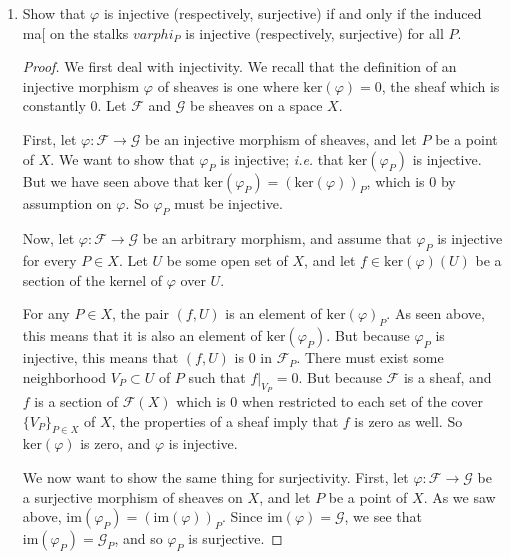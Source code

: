 \documentclass[12pt]{article}
\theoremstyle{definition}
\newenvironment{problem}[2][Problem]{\begin{trivlist}
\item[\hskip \labelsep {\bfseries #1}\hskip \labelsep {\bfseries #2.}]}{\end{trivlist}}
\begin{document}
\begin{problem}{2}
\begin{enumerate}[label=(\alph*)]
\begin{proof}
\begin{align*}
                &= \varphi_P(f\lvert_{V'}, V')
            \end{align*}
            So, the element $(g,V)$ of $\text{im}(\varphi)_P$ is also in $\text{im}(\varphi_P)$.
        \end{proof}
        \item Show that $\varphi$ is injective (respectively, surjective) if and only if the induced ma[ on the stalks $varphi_P$ is injective (respectively, surjective) for all $P$.
        \begin{proof}
        We first deal with injectivity. We recall that the definition of an injective morphism $\varphi$ of sheaves is one where $\text{ker}(\varphi) = 0$, the sheaf which is constantly $0$. Let $\mathcal F$ and $\mathcal G$ be sheaves on a space $X$.
        \par First, let $\varphi: \mathcal F \to \mathcal G$ be an injective morphism of sheaves, and let $P$ be a point of $X$. We want to show that $\varphi_P$ is injective; \textit{i.e.} that $\text{ker}(\varphi_P)$ is injective. But we have seen above that $\text{ker}(\varphi_P) = (\text{ker}(\varphi))_P$, which is $0$ by assumption on $\varphi$. So $\varphi_P$ must be injective.  
        \par Now, let $\varphi: \mathcal F \to \mathcal G$ be an arbitrary morphism, and assume that $\varphi_P$ is injective for every $P \in X$. Let $U$ be some open set of $X$, and let $f \in \text{ker}(\varphi)(U)$ be a section of the kernel of $\varphi$ over $U$.
        \par For any $P \in X$, the pair $(f, U)$ is an element of $\text{ker}(\varphi)_P$. As seen above, this means that it is also an element of $\text{ker}(\varphi_P)$. But because $\varphi_P$ is injective, this means that $(f, U)$ is $0$ in $\mathcal F_P$. There must exist some neighborhood $V_P \subset U$ of $P$ such that $f\lvert_{V_P} = 0$. But because $\mathcal F$ is a sheaf, and $f$ is a section of $\mathcal F(X)$ which is $0$ when restricted to each set of the cover $\{V_P\}_{P \in X}$ of $X$, the properties of a sheaf imply that $f$ is zero as well. So $\text{ker}(\varphi)$ is zero, and $\varphi$ is injective.
        \par We now want to show the same thing for surjectivity. First, let $\varphi: \mathcal F \to \mathcal G$ be a surjective morphism of sheaves on $X$, and let $P$ be a point of $X$. As we saw above, $\text{im}(\varphi_P) = (\text{im}(\varphi))_P$. Since $\text{im}(\varphi) = \mathcal G$, we see that $\text{im}(\varphi_P) = \mathcal G_P$, and so $\varphi_P$ is surjective.

\end{proof}
\end{enumerate}
\end{problem}
\end{document}
